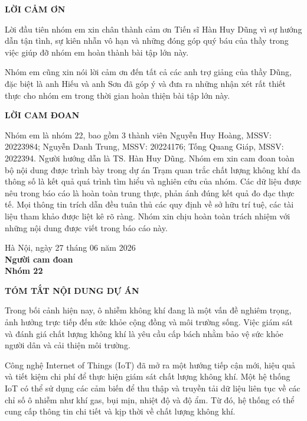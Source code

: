 \documentclass[12pt,a4paper]{article}
\begin{document}
\newpage
\begin{center}
    \textbf{\Large LỜI CẢM ƠN}
\end{center}
\vspace{1cm}

Lời đầu tiên nhóm em xin chân thành cảm ơn Tiến sĩ Hàn Huy Dũng vì sự hướng dẫn tận tình, sự kiên nhẫn vô hạn và những đóng góp quý báu của thầy trong việc giúp đỡ nhóm em hoàn thành bài tập lớn này.

Nhóm em cũng xin nói lời cảm ơn đến tất cả các anh trợ giảng của thầy Dũng, đặc biệt là anh Hiếu và anh Sơn đã góp ý và đưa ra những nhận xét rất thiết thực cho nhóm em trong thời gian hoàn thiện bài tập lớn này.

\newpage
\begin{center}
    \textbf{\Large LỜI CAM ĐOAN}
\end{center}
\vspace{1cm}

Nhóm em là nhóm 22, bao gồm 3 thành viên Nguyễn Huy Hoàng, MSSV: 20223984; Nguyễn Danh Trung, MSSV: 20224176; Tống Quang Giáp, MSSV: 2022394. Người hướng dẫn là TS. Hàn Huy Dũng. Nhóm em xin cam đoan toàn bộ nội dung được trình bày trong dự án Trạm quan trắc chất lượng không khí đa thông số là kết quả quá trình tìm hiểu và nghiên cứu của nhóm. Các dữ liệu được nêu trong báo cáo là hoàn toàn trung thực, phản ánh đúng kết quả đo đạc thực tế. Mọi thông tin trích dẫn đều tuân thủ các quy định về sở hữu trí tuệ, các tài liệu tham khảo được liệt kê rõ ràng. Nhóm xin chịu hoàn toàn trách nhiệm với những nội dung được viết trong báo cáo này.

\vspace{1.5cm}
\begin{flushright}
Hà Nội, ngày 27 tháng 06 năm 2026\\[10pt]
\textbf{Người cam đoan}\\[2.5cm]
\textbf{Nhóm 22}
\end{flushright}
\newpage
\begin{center}
    \textbf{\Large TÓM TẮT NỘI DUNG DỰ ÁN}
\end{center}
\vspace{1cm}

Trong bối cảnh hiện nay, ô nhiễm không khí đang là một vấn đề nghiêm trọng, ảnh hưởng trực tiếp đến sức khỏe cộng đồng và môi trường sống. Việc giám sát và đánh giá chất lượng không khí là yêu cầu cấp bách nhằm bảo vệ sức khỏe người dân và cải thiện môi trường.

Công nghệ Internet of Things (IoT) đã mở ra một hướng tiếp cận mới, hiệu quả và tiết kiệm chi phí để thực hiện giám sát chất lượng không khí. Một hệ thống IoT có thể sử dụng các cảm biến để thu thập và truyền tải dữ liệu liên tục về các chỉ số ô nhiễm như khí gas, bụi mịn, nhiệt độ và độ ẩm. Từ đó, hệ thống có thể cung cấp thông tin chi tiết và kịp thời về chất lượng không khí.
\end{document}
